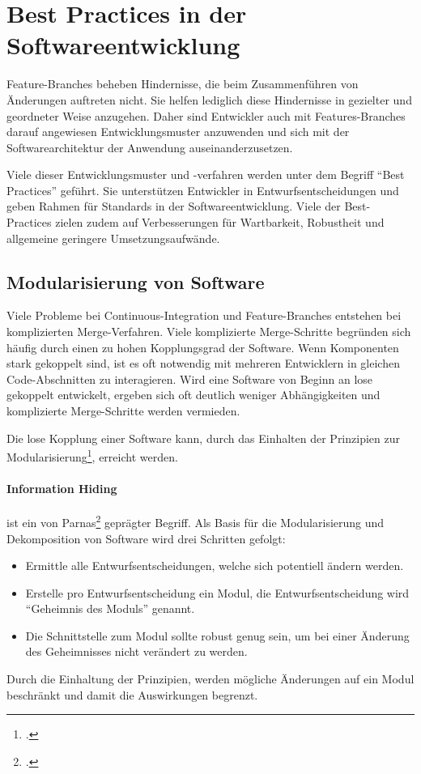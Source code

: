 \section{Best Practices in der Softwareentwicklung}

Feature-Branches beheben Hindernisse, die beim Zusammenführen von Änderungen auftreten nicht. Sie helfen lediglich diese Hindernisse in gezielter und geordneter Weise anzugehen. Daher sind Entwickler auch mit Features-Branches darauf angewiesen Entwicklungsmuster anzuwenden und sich mit der Softwarearchitektur der Anwendung auseinanderzusetzen.

Viele dieser Entwicklungsmuster und -verfahren werden unter dem Begriff ``Best Practices'' geführt. Sie unterstützen Entwickler in Entwurfsentscheidungen und geben Rahmen für Standards in der Softwareentwicklung. Viele der Best-Practices zielen zudem auf Verbesserungen für Wartbarkeit, Robustheit und allgemeine geringere Umsetzungsaufwände.

\subsection{Modularisierung von Software}

Viele Probleme bei Continuous-Integration und Feature-Branches entstehen bei komplizierten Merge-Verfahren. Viele komplizierte Merge-Schritte begründen sich häufig durch einen zu hohen Kopplungsgrad der Software. Wenn Komponenten stark gekoppelt sind, ist es oft notwendig mit mehreren Entwicklern in gleichen Code-Abschnitten zu interagieren. Wird eine Software von Beginn an lose gekoppelt entwickelt, ergeben sich oft deutlich weniger Abhängigkeiten und komplizierte Merge-Schritte werden vermieden.

Die lose Kopplung einer Software kann, durch das Einhalten der Prinzipien zur Modularisierung\footcite{2012-barth-modularisation}, erreicht werden. 

\paragraph{Information Hiding} ist ein von Parnas\footcite{1972-parnas} geprägter Begriff. Als Basis für die Modularisierung und Dekomposition von Software wird drei Schritten gefolgt:
\begin{itemize}
\item Ermittle alle Entwurfsentscheidungen, welche sich potentiell ändern werden.
\item Erstelle pro Entwurfsentscheidung ein Modul, die Entwurfsentscheidung wird ``Geheimnis des Moduls'' genannt.
\item Die Schnittstelle zum Modul sollte robust genug sein, um bei einer Änderung des Geheimnisses nicht verändert zu werden.
\end{itemize}
Durch die Einhaltung der Prinzipien, werden mögliche Änderungen auf ein Modul beschränkt und damit die Auswirkungen begrenzt.
